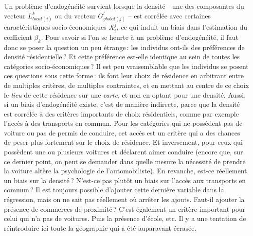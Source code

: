 \documentclass[
  9pt,
  a4paper,
  DIV=11]{scrreprt}
\begin{document}
Un problème d'endogénéité survient lorsque la densité\,-- une des
composantes du vecteur \(L^k_{local(i)}\) ou du vecteur
\(G^l_{global(j)}\) -- est corrélée avec certaines caractéristiques
socio-économiques \(X^j_i\), ce qui induit un biais dans l'estimation du
cœfficient \(\beta_k\). Pour savoir si l'on se heurte à un problème
d'endogénéité, il faut donc se poser la question un peu étrange\,: les
individus ont-ils des préférences de densité résidentielle\,? Et cette
préférence est-elle identique au sein de toutes les catégories
socio-économiques\,? Il est peu vraisemblable que les individus se
posent ces questions sous cette forme\,: ils font leur choix de
résidence en arbitrant entre de multiples critères, de multiples
contraintes, et en mettant au centre de ce choix le \emph{lieu} de cette
résidence sur une \emph{carte}, et non en optant pour une densité.
Aussi, si un biais d'endogénéité existe, c'est de manière indirecte,
parce que la densité est corrélée à des critères importants de choix
résidentiels, comme par exemple l'accès à des transports en commun. Pour
les catégories qui ne possèdent pas de voiture ou pas de permis de
conduire, cet accès est un critère qui a des chances de peser plus
fortement sur le choix de résidence. Et inversement, pour ceux qui
possèdent une ou plusieurs voitures et déclarent aimer conduire (encore
que, sur ce dernier point, on peut se demander dans quelle mesure la
nécessité de prendre la voiture altère la psychologie de
l'automobiliste). En revanche, est-ce réellement un biais sur la
densité\,? N'est-ce pas plutôt un biais sur l'accès aux transports en
commun\,? Il est toujours possible d'ajouter cette dernière variable
dans la régression, mais on ne sait pas réellement où arrêter les
ajouts. Faut-il ajouter la présence de commerces de proximité\,? C'est
également un critère important pour celui qui n'a pas de voitures. Puis
la présence d'école, etc. Il y a une tentation de réintroduire ici toute
la géographie qui a été auparavant écrasée.
\end{document}
